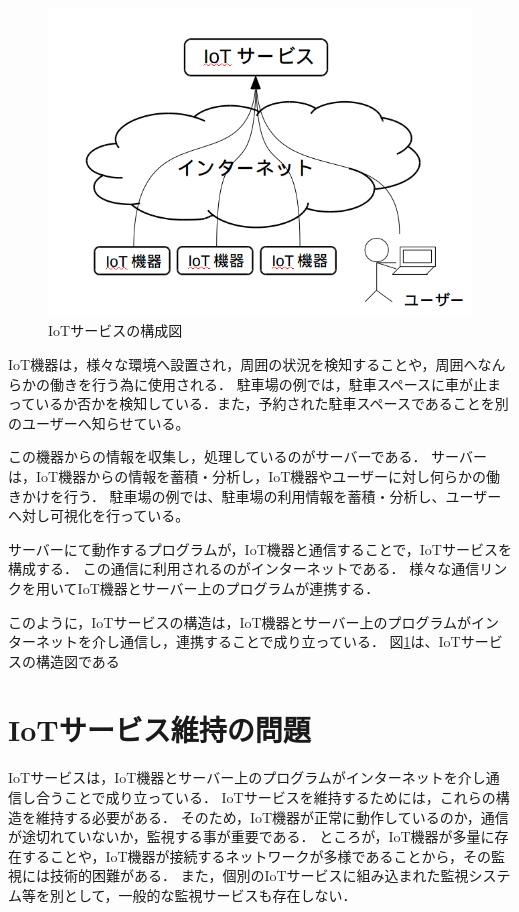 \begin{figure}[htbp]
\includegraphics[width=14cm]{images/IoTservice.png}
\caption{IoTサービスの構成図}
\label{fig:IoTservice}
\end{figure}

IoT機器は，様々な環境へ設置され，周囲の状況を検知することや，周囲へなんらかの働きを行う為に使用される．
駐車場の例では，駐車スペースに車が止まっているか否かを検知している．また，予約された駐車スペースであることを別のユーザーへ知らせている。
\medskip

この機器からの情報を収集し，処理しているのがサーバーである．
サーバーは，IoT機器からの情報を蓄積・分析し，IoT機器やユーザーに対し何らかの働きかけを行う．
駐車場の例では、駐車場の利用情報を蓄積・分析し、ユーザーへ対し可視化を行っている。
\medskip

サーバーにて動作するプログラムが，IoT機器と通信することで，IoTサービスを構成する．
この通信に利用されるのがインターネットである．
様々な通信リンクを用いてIoT機器とサーバー上のプログラムが連携する．
\medskip

このように，IoTサービスの構造は，IoT機器とサーバー上のプログラムがインターネットを介し通信し，連携することで成り立っている．
図\ref{fig:IoTservice}は、IoTサービスの構造図である

\section{IoTサービス維持の問題}
IoTサービスは，IoT機器とサーバー上のプログラムがインターネットを介し通信し合うことで成り立っている．
IoTサービスを維持するためには，これらの構造を維持する必要がある．
そのため，IoT機器が正常に動作しているのか，通信が途切れていないか，監視する事が重要である．
ところが，IoT機器が多量に存在することや，IoT機器が接続するネットワークが多様であることから，その監視には技術的困難がある．
また，個別のIoTサービスに組み込まれた監視システム等を別として，一般的な監視サービスも存在しない．
\medskip

